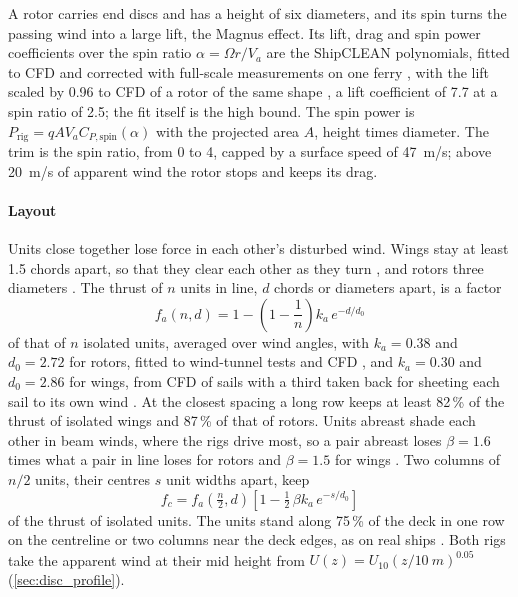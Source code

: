 A rotor carries end discs and has a height of six diameters, and its spin turns the passing wind into a large lift, the Magnus effect. Its lift, drag and spin power coefficients over the spin ratio $\alpha=\Omega r/V_a$ are the ShipCLEAN polynomials, fitted to CFD and corrected with full-scale measurements on one ferry \citep{tillig2020}, with the lift scaled by 0.96 to CFD of a rotor of the same shape \citep{han2025}, a lift coefficient of 7.7 at a spin ratio of 2.5; the fit itself is the high bound. The spin power is $P_\mathrm{rig} = q A V_a C_{P,\mathrm{spin}}(\alpha)$ with the projected area $A$, height times diameter. The trim is the spin ratio, from 0 to 4, capped by a surface speed of \SI{47}{m/s}; above \SI{20}{m/s} of apparent wind the rotor stops and keeps its drag.

\paragraph{Layout} Units close together lose force in each other's disturbed wind. Wings stay at least 1.5 chords apart, so that they clear each other as they turn \citep{wang2024}, and rotors three diameters \citep{bordogna2020}. The thrust of $n$ units in line, $d$ chords or diameters apart, is a factor
\begin{equation}
f_a(n, d) = 1 - \left(1 - \frac{1}{n}\right) k_a\, e^{-d/d_0}
\label{eq:array_factor}
\end{equation}
of that of $n$ isolated units, averaged over wind angles, with $k_a=0.38$ and $d_0=2.72$ for rotors, fitted to wind-tunnel tests and CFD \citep{bordogna2020,han2025}, and $k_a=0.30$ and $d_0=2.86$ for wings, from CFD of sails \citep{malmek2024,xu2025} with a third taken back for sheeting each sail to its own wind \citep{vanreen2026}. At the closest spacing a long row keeps at least 82\,\% of the thrust of isolated wings and 87\,\% of that of rotors. Units abreast shade each other in beam winds, where the rigs drive most, so a pair abreast loses $\beta=1.6$ times what a pair in line loses for rotors \citep{bordogna2020} and $\beta=1.5$ for wings \citep{vanreen2026}. Two columns of $n/2$ units, their centres $s$ unit widths apart, keep
\begin{equation}
f_c = f_a\!\left(\tfrac{n}{2}, d\right) \left[1 - \tfrac{1}{2}\, \beta k_a\, e^{-s/d_0}\right]
\label{eq:column_factor}
\end{equation}
of the thrust of isolated units. The units stand along 75\,\% of the deck in one row on the centreline or two columns near the deck edges, as on real ships \citep{emsa2023,contopoulos2023}. Both rigs take the apparent wind at their mid height from $U(z)=U_{10}(z/\SI{10}{m})^{0.05}$ (\cref{sec:disc_profile}).


